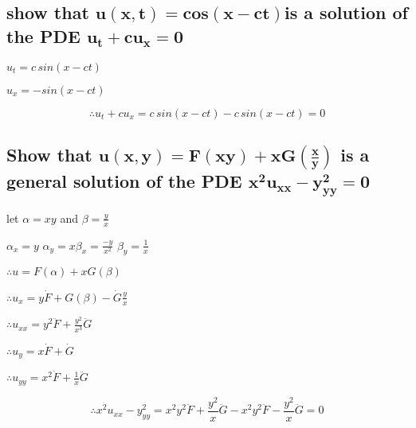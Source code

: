 \documentclass[12 pt]{article}
\begin{document}
\subsection*{show that $\mathbf{u(x,t)=cos(x-ct)}$is a solution of the PDE $\mathbf{u_t+cu_x=0}$}
\begin{tcolorbox}
$u_t=c\,sin(x-ct)$

$u_x=-sin(x-ct)$

$$\boxed{\therefore u_t+cu_x=c\,sin(x-ct)-c\,sin(x-ct)=0}$$
\end{tcolorbox}
\newpage
\subsection*{Show that $\mathbf{u(x,y) = F(xy) + xG(\frac{x}{y})}$ is a general solution of the PDE  $\mathbf{x^2u_{xx}-y^2_{yy}=0}$}
\begin{tcolorbox}
[width=\linewidth, sharp corners=all, colback=white!95!black]
let $\alpha=xy$ and $\beta=\frac{y}{x}$

$\alpha_x=y$\hspace{0.3cm} $\alpha_y=x$\hspace{0.3cm}$\beta_x=\frac{-y}{x^2}$\hspace{0.3cm} $\beta_y=\frac{1}{x}$

$\therefore u=F(\alpha)+xG(\beta)$

$\therefore u_x= y\dot{F}+ G(\beta)- \dot{G} \frac{y}{x}$

$\therefore u_{xx} = y^2\ddot{F}+\frac{y^2}{x^3}\ddot{G}$

$\therefore u_y=x\dot{F}+\dot{G}$

$\therefore u_{yy}=x^2\dot{F}+\frac{1}{x}\ddot{G}$

$$\boxed{
\therefore x^2u_{xx}-y^2_{yy} = x^2y^2\ddot{F}+\frac{y^2}{x}\ddot{G}-x^2y^2\ddot{F}-\frac{y^2}{x}\ddot{G}=0}$$
\end{tcolorbox}
\end{document}
